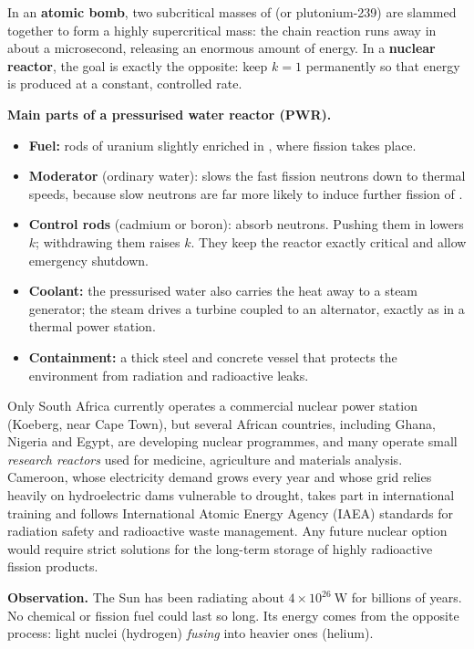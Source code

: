 \documentclass[11pt]{article}
\newcounter{popsec}
\newcounter{popsub}
\newcommand{\courssub}[1]{%
  \stepcounter{popsub}%
  \par\vspace{9pt}\noindent{\popxbold\fontsize{11.5}{13}\selectfont\color{popink}{\color{poporange}\thepopsec.\thepopsub}\hspace{6pt}#1}\par\nopagebreak\vspace{4pt}
}
\begin{document}
In an \textbf{atomic bomb}, two subcritical masses of  (or plutonium-239) are slammed together to form a highly supercritical mass: the chain reaction runs away in about a microsecond, releasing an enormous amount of energy. In a \textbf{nuclear reactor}, the goal is exactly the opposite: keep $k = 1$ permanently so that energy is produced at a constant, controlled rate.

\textbf{Main parts of a pressurised water reactor (PWR).}
\begin{itemize}
\item \textbf{Fuel:} rods of uranium slightly enriched in , where fission takes place.
\item \textbf{Moderator} (ordinary water): slows the fast fission neutrons down to thermal speeds, because slow neutrons are far more likely to induce further fission of .
\item \textbf{Control rods} (cadmium or boron): absorb neutrons. Pushing them in lowers $k$; withdrawing them raises $k$. They keep the reactor exactly critical and allow emergency shutdown.
\item \textbf{Coolant:} the pressurised water also carries the heat away to a steam generator; the steam drives a turbine coupled to an alternator, exactly as in a thermal power station.
\item \textbf{Containment:} a thick steel and concrete vessel that protects the environment from radiation and radioactive leaks.
\end{itemize}

\begin{savaistu}
Only South Africa currently operates a commercial nuclear power station (Koeberg, near Cape Town), but several African countries, including Ghana, Nigeria and Egypt, are developing nuclear programmes, and many operate small \emph{research reactors} used for medicine, agriculture and materials analysis. Cameroon, whose electricity demand grows every year and whose grid relies heavily on hydroelectric dams vulnerable to drought, takes part in international training and follows International Atomic Energy Agency (IAEA) standards for radiation safety and radioactive waste management. Any future nuclear option would require strict solutions for the long-term storage of highly radioactive fission products.
\end{savaistu}

\courssub{Nuclear fusion}

\textbf{Observation.} The Sun has been radiating about $4 \times 10^{26}\ \mathrm{W}$ for billions of years. No chemical or fission fuel could last so long. Its energy comes from the opposite process: light nuclei (hydrogen) \emph{fusing} into heavier ones (helium).
\end{document}
